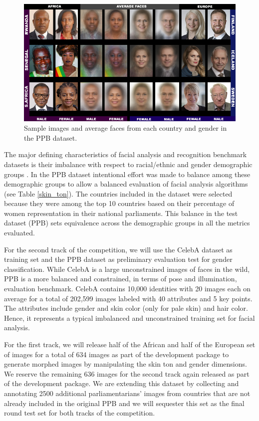 \documentclass[11pt, oneside]{article}
\makeatletter
\let\@internalcite\cite
\def\cite{\def\citeauthoryear##1##2{##1, ##2}\@internalcite}
\makeatother
\begin{document}
\begin{figure}[t]
    \label{fig_ppb}
    \centering
    \includegraphics[width=140mm]{fig/ppb}
    \caption{Sample images and average faces from each country and gender in the PPB dataset.}
\end{figure}



The major defining characteristics of facial analysis and recognition benchmark datasets is their imbalance with respect to racial/ethnic and gender demographic groups \cite{phillips2011other, han2015demographic}. In the PPB dataset intentional effort was made to balance among these demographic groups to allow a balanced evaluation of facial analysis algorithms (see Table \ref{skin_ton}). The countries included in the dataset were selected because they were among the top 10 countries based on their percentage of women representation in their national parliaments. This balance in the test dataset (PPB) sets equivalence across the demographic groups in all the metrics evaluated.



For the second track of the competition, we will use the CelebA dataset \cite{liu2015deep} as training set and the PPB dataset as preliminary evaluation test for gender classification. While CelebA is a large unconstrained images of faces in the wild, PPB is a more balanced and constrained, in terms of pose and illumination, evaluation benchmark. CelebA contains 10,000 identities with 20 images each on average for a total of 202,599 images labeled with 40 attributes and 5 key points. The attributes include gender and skin color (only for pale skin) and hair color. Hence, it represents a typical imbalanced and unconstrained training set for facial analysis.

For the first track, we will release half of the African and half of the European set of images for a total of 634 images as part of the development package to generate morphed images by manipulating the skin ton and gender dimensions. We reserve the remaining 636 images for the second track again released as part of the development package. We are extending this dataset by collecting and annotating 2500 additional parliamentarians' images from countries that are not already included in the original PPB and we will sequester this set as the final round test set for both tracks of the competition. 
\end{document}
